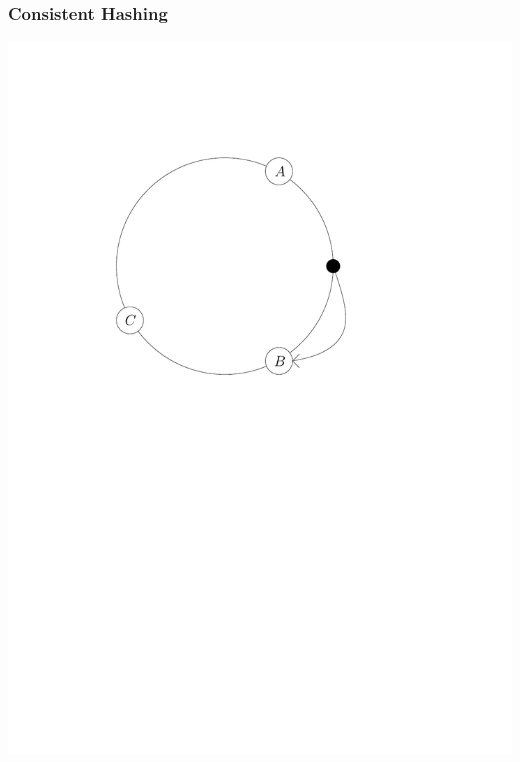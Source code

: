 \documentclass{beamer}
\begin{document}
    \begin{frame}
        \frametitle{Consistent Hashing}
        \includegraphics[scale=0.3,page=1]{hashing.pdf}
        \hspace{1cm}

\end{frame}
\end{document}
